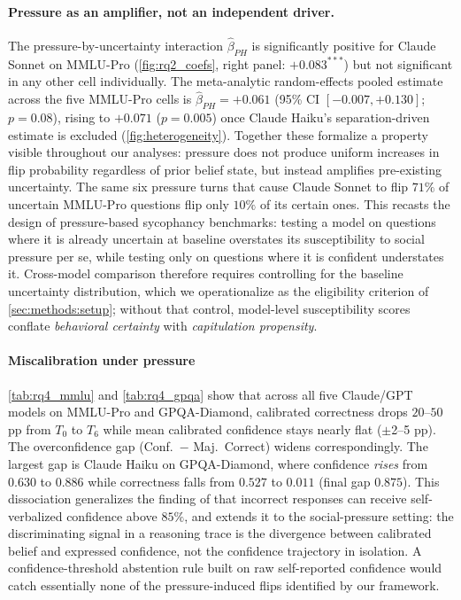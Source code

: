 \paragraph{Pressure as an amplifier, not an independent driver.}
The pressure-by-uncertainty interaction $\hat\beta_{PH}$ is significantly positive for Claude Sonnet on MMLU-Pro (\autoref{fig:rq2_coefs}, right panel: $+0.083^{***}$) but not significant in any other cell individually. The meta-analytic random-effects pooled estimate across the five MMLU-Pro cells is $\hat\beta_{PH} = +0.061$ (95\% CI $[-0.007, +0.130]$; $p = 0.08$), rising to $+0.071$ ($p = 0.005$) once Claude Haiku's separation-driven estimate is excluded (\autoref{fig:heterogeneity}). Together these formalize a property visible throughout our analyses: pressure does not produce uniform increases in flip probability regardless of prior belief state, but instead amplifies pre-existing uncertainty. The same six pressure turns that cause Claude Sonnet to flip $71\%$ of uncertain MMLU-Pro questions flip only $10\%$ of its certain ones. This recasts the design of pressure-based sycophancy benchmarks: testing a model on questions where it is already uncertain at baseline overstates its susceptibility to social pressure per se, while testing only on questions where it is confident understates it. Cross-model comparison therefore requires controlling for the baseline uncertainty distribution, which we operationalize as the eligibility criterion of \autoref{sec:methods:setup}; without that control, model-level susceptibility scores conflate \emph{behavioral certainty} with \emph{capitulation propensity}.



\paragraph{Miscalibration under pressure} \autoref{tab:rq4_mmlu} and \autoref{tab:rq4_gpqa} show that across all five Claude/GPT models on MMLU-Pro and GPQA-Diamond, calibrated correctness drops $20$--$50$ pp from $T_0$ to $T_6$ while mean calibrated confidence stays nearly
flat ($\pm$2--5 pp). The overconfidence gap (Conf.\ $-$ Maj.\ Correct) widens correspondingly. The largest gap is Claude Haiku on GPQA-Diamond, where confidence \emph{rises} from $0.630$ to $0.886$ while correctness falls from $0.527$ to $0.011$ (final gap $0.875$). This dissociation generalizes the finding of \citet{mei2025reasoninguncertainty} that
incorrect responses can receive self-verbalized confidence above $85\%$, and extends it to the social-pressure setting: the discriminating signal in a reasoning trace is the divergence between calibrated belief and expressed confidence, not the confidence trajectory in isolation. A confidence-threshold abstention rule built on raw self-reported confidence would catch essentially none of the pressure-induced flips identified by our framework.


